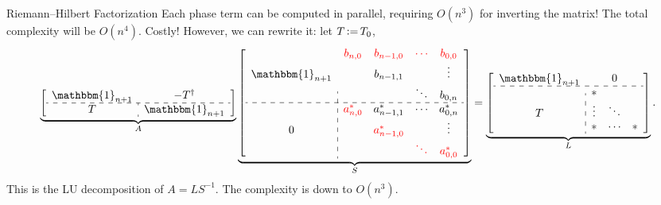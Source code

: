 \begin{frame}{Riemann--Hilbert Factorization}
    Each phase term can be computed in parallel, requiring $O(n^3)$ for inverting the matrix! The total complexity will be $O(n^4)$. Costly! However, we can rewrite it: let $T \operatorname{\vcentcolon=} T_0$,
    \begin{equation*}
        \underbrace{\left[\begin{array}{c:c}
            \mathbbm{1}_{n+1} & -T^\dagger \\ \hdashline
            T & \mathbbm{1}_{n+1}
        \end{array}\right]}_{A} \underbrace{\left[\begin{array}{c:cccc}
            & \color{red}b_{n,0} & \color{red}b_{n-1,0} & \color{red}\cdots & \color{red}b_{0,0} \\
            \mathbbm{1}_{n+1} & & b_{n-1,1} & & \vdots \\
            & & & \ddots & b_{0,n} \\ \hdashline
            & \color{red}a_{n,0}^* & a_{n-1,1}^* & \cdots & a_{0,n}^* \\
            0 & & \color{red}a_{n-1,0}^* & & \vdots \\
            & & & \color{red}\ddots & \color{red}a_{0,0}^*
        \end{array}\right]}_{S} = \underbrace{\left[\begin{array}{c:ccc}
            \mathbbm{1}_{n+1} & & 0 \\ \hdashline
            & * \\
            T & \vdots & \ddots \\
            & * & \cdots & *
        \end{array}\right]}_{L}.
    \end{equation*}
    This is the LU decomposition of $A=LS^{-1}$. The complexity is down to $O(n^3)$.
\end{frame}

